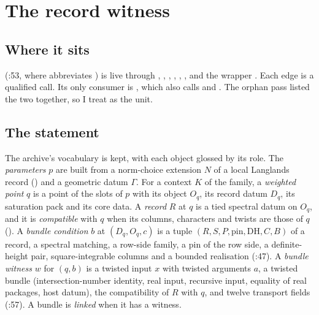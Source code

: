 \documentclass[11pt]{article}
\theoremstyle{remark}
\begin{document}
\section{The record witness \texorpdfstring{}{bwit\_exists\_alt}}\label{sec:bwit}

\subsection{Where it sits}

 (:53, where  abbreviates ) is live through
, , , , , ,  and the wrapper . Each edge is a qualified call. Its only consumer is , which also calls  and . The orphan pass listed the two together, so I treat  as the unit.

\subsection{The statement}

The archive's vocabulary is kept, with each object glossed by its role. The \emph{parameters} $p$ are built from a norm-choice extension $N$ of a local Langlands record () and a geometric datum $\Gamma$. For a context $K$ of the family, a \emph{weighted point} $q$ is a point of the slots of $p$ with its object $O_q$, its record datum $D_q$, its saturation pack and its core data. A \emph{record} $R$ at $q$ is a tied spectral datum on $O_q$, and it is \emph{compatible} with $q$ when its columns, characters and twists are those of $q$ (). A \emph{bundle condition} $b$ at $(D_q,O_q,c)$ is a tuple $(R,S,P,\mathrm{pin},\mathrm{DH},C,B)$ of a record, a spectral matching, a row-side family, a pin of the row side, a definite-height pair, square-integrable columns and a bounded realisation (:47). A \emph{bundle witness} $w$ for $(q,b)$ is a twisted input $x$ with twisted arguments $a$, a twisted bundle (intersection-number identity, real input, recursive input, equality of real packages, host datum), the compatibility of $R$ with $q$, and twelve transport fields (:57). A bundle is \emph{linked} when it has a witness.
\end{document}
